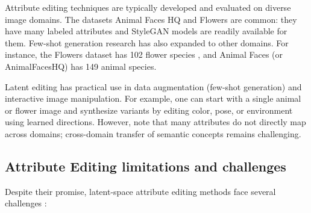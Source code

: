 Attribute editing techniques are typically developed and evaluated on diverse image domains. The datasets Animal Faces 
HQ and Flowers are common: they have many labeled attributes and StyleGAN models are readily available for them. 
Few-shot generation research has also expanded to other domains. For instance, the Flowers dataset has 102 flower 
species \citep{gupta2024conditionaldistributionmodellingfewshot}, and Animal Faces (or AnimalFacesHQ) has 149 animal species.

Latent editing has practical use in data augmentation (few-shot generation) and interactive image manipulation. For 
example, one can start with a single animal or flower image and synthesize variants by editing color, pose, or environment
 using learned directions. However, note that many attributes do not directly map across domains; cross-domain transfer of 
 semantic concepts remains challenging.

\subsection{Attribute Editing limitations and challenges}

Despite their promise, latent-space attribute editing methods face several challenges \citep{wu2020stylespaceanalysisdisentangledcontrols,AGE,ding2023stableattributegroupediting,shen2020interpretinglatentspacegans,xia2022ganinversionsurvey,liu2023delvingstyleganinversionimage}:

